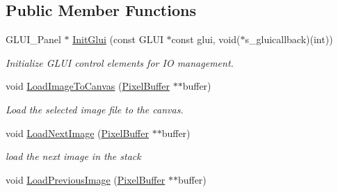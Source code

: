 \subsection*{Public Member Functions}
\begin{DoxyCompactItemize}
\item 
G\+L\+U\+I\+\_\+\+Panel $\ast$ \hyperlink{classimage__tools_1_1MIAIOManager_a02267caa7b3b9746d45e5f89138c1376}{Init\+Glui} (const G\+L\+UI $\ast$const glui, void($\ast$s\+\_\+gluicallback)(int))
\begin{DoxyCompactList}\small\item\em Initialize G\+L\+UI control elements for IO management. \end{DoxyCompactList}\item 
void \hyperlink{classimage__tools_1_1MIAIOManager_a0017f31cc3412d895641b46e526222ff}{Load\+Image\+To\+Canvas} (\hyperlink{classimage__tools_1_1PixelBuffer}{Pixel\+Buffer} $\ast$$\ast$buffer)\hypertarget{classimage__tools_1_1MIAIOManager_a0017f31cc3412d895641b46e526222ff}{}\label{classimage__tools_1_1MIAIOManager_a0017f31cc3412d895641b46e526222ff}

\begin{DoxyCompactList}\small\item\em Load the selected image file to the canvas. \end{DoxyCompactList}\item 
void \hyperlink{classimage__tools_1_1MIAIOManager_a0a9e96f4c4d3b581dcbabeae6c602c7a}{Load\+Next\+Image} (\hyperlink{classimage__tools_1_1PixelBuffer}{Pixel\+Buffer} $\ast$$\ast$buffer)\hypertarget{classimage__tools_1_1MIAIOManager_a0a9e96f4c4d3b581dcbabeae6c602c7a}{}\label{classimage__tools_1_1MIAIOManager_a0a9e96f4c4d3b581dcbabeae6c602c7a}

\begin{DoxyCompactList}\small\item\em load the next image in the stack \end{DoxyCompactList}\item 
void \hyperlink{classimage__tools_1_1MIAIOManager_af6b6300a284f8ea35f57a20fdffefcb6}{Load\+Previous\+Image} (\hyperlink{classimage__tools_1_1PixelBuffer}{Pixel\+Buffer} $\ast$$\ast$buffer)\hypertarget{classimage__tools_1_1MIAIOManager_af6b6300a284f8ea35f57a20fdffefcb6}{}\label{classimage__tools_1_1MIAIOManager_af6b6300a284f8ea35f57a20fdffefcb6}


\end{DoxyCompactItemize}
